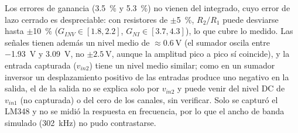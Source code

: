 \documentclass[9pt, conference]{IEEEtran}
\newcommand{\qV}[1]{\SI{#1}{\volt}}
\newcommand{\pct}[1]{\SI{#1}{\percent}}
\begin{document}
Los errores de ganancia (\pct{+3.5} y \pct{+5.3}) no vienen del integrado, cuyo error de lazo cerrado es despreciable: con resistores de $\pm$\pct{5}, $R_2/R_1$ puede desviarse hasta $\pm$\pct{10} ($G_{INV}\in[1.8,2.2]$, $G_{NI}\in[3.7,4.3]$), lo que cubre lo medido. Las señales tienen además un nivel medio de $\approx\qV{0.6}$ (el sumador oscila entre \qV{-1.93} y \qV{+3.09}, no $\pm\qV{2.5}$, aunque la amplitud pico a pico sí coincide), y la entrada capturada ($v_{in2}$) tiene un nivel medio similar; como en un sumador inversor un desplazamiento positivo de las entradas produce uno negativo en la salida, el de la salida no se explica solo por $v_{in2}$ y puede venir del nivel DC de $v_{in1}$ (no capturada) o del cero de los canales, sin verificar. Solo se capturó el LM348 y no se midió la respuesta en frecuencia, por lo que el ancho de banda simulado (\SI{302}{\kilo\hertz}) no pudo contrastarse.

\end{document}
